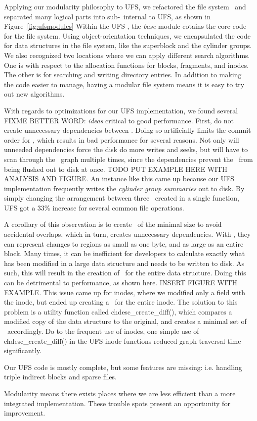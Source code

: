Applying our modularity philosophy to UFS, we refactored the file system
\module\ and separated many logical parts into sub-\modules\ internal to UFS,
as shown in Figure~\ref{fig:ufsmodules}
Within the UFS \module, the \emph{base} module cotains the core code for the
file system. Using object-orientation techniques, we encapsulated the code
for data structures in the file system, like the superblock and the cylinder
groups. We also recognized two locations where we can apply different
search algorithms. One is with respect to the allocation functions for blocks,
fragments, and inodes. The other is for searching and writing directory
entries. In addition to making the code easier to manage, having a modular
file system means it is easy to try out new algorithms.

With regards to optimizations for our UFS implementation, we found several
FIXME BETTER WORD: \emph{ideas} critical to good performance. First, do not
create unnecessary dependencies between \chdescs. Doing so artificially limits
the commit order for \chdescs, which results in bad performance for several
reasons. Not only will unneeded dependencies force the disk do more writes and
seeks, but \Kudos will have to scan through the \chdesc\ graph
multiple times, since the dependencies prevent the \chdescs\ from being
flushed out to disk at once. TODO PUT EXAMPLE HERE WITH ANALYSIS AND FIGURE. 
An instance like this came up because our UFS implementation frequently writes
the \emph{cylinder group summaries} out to disk. By simply changing the
arrangement between three \chdescs\ created in a single function, UFS got a
33\% increase for several common file operations.

A corollary of this observation is to create \chdescs\ of the minimal size
to avoid accidental overlaps, which in turn, creates unnecessary dependencies.
With \chdescs, they can represent changes to regions as small as one byte, and
as large as an entire block. Many times, it can be inefficient for developers
to calculate exactly what has been modified in a large data structure and needs
to be written to disk. As such, this will result in the creation of \chdescs\ 
for the entire data structure. Doing this can be detrimental to performance,
as shown here. INSERT FIGURE WITH EXAMPLE. This issue came up for inodes, where
we modified only a field with the inode, but ended up creating a \chdesc\ 
for the entire inode. The solution to this problem is a utility
function called chdesc\_create\_diff(), which compares a modified copy of the
data structure to the original, and creates a minimal set of \chdescs\ 
accordingly. Do to the frequent use of inodes, one simple use of
chdesc\_create\_diff() in the UFS inode functions reduced \chdescs graph
traversal time significantly.

Our UFS code is mostly complete, but some features are missing:
i.e. handling triple indirect blocks and sparse files.

Modularity means there exists places where we are less efficient
than a more integrated implementation. These trouble spots present
an opportunity for improvement.

